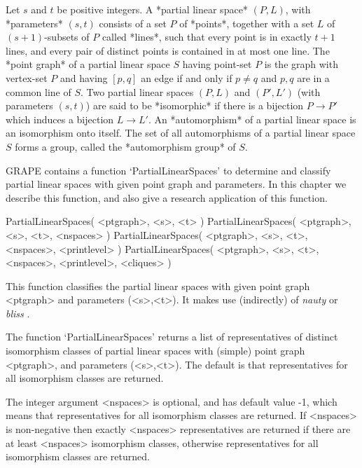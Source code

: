 %
%
%
%
\def\GRAPE{\sf GRAPE}
\def\nauty{\it nauty}
\def\bliss{\it bliss}
\def\G{\Gamma}
\def\Aut{{\rm Aut}\,}
\def\x{\times}


Let $s$ and  $t$  be positive integers. A *partial linear space*
$(P,L)$, with *parameters* $(s,t)$ consists of a set $P$ of *points*,
together with a set $L$ of $(s+1)$-subsets of $P$ called *lines*,
such that every point is in exactly $t+1$ lines, and every pair of
distinct points is contained in at most one line.  The *point graph*
of a partial linear space $S$ having point-set $P$ is the graph with
vertex-set $P$ and having $[p,q]$ an edge if and only if $p\not=q$ and
$p,q$ are in a common line of $S$. Two partial linear spaces $(P,L)$
and $(P',L')$ (with parameters $(s,t)$) are said to be *isomorphic*
if there is a bijection $P\to P'$ which induces a bijection $L\to L'$.
An *automorphism* of a partial linear space is an isomorphism onto itself.
The set of all automorphisms of a partial linear space $S$ forms a group,
called the *automorphism group* of $S$.

{\GRAPE} contains a function `PartialLinearSpaces' to determine and
classify partial linear spaces with given point graph and parameters.
In this chapter we describe this function, and also give a research
application of this function.


\>PartialLinearSpaces( <ptgraph>, <s>, <t> )
\>PartialLinearSpaces( <ptgraph>, <s>, <t>, <nspaces> )
\>PartialLinearSpaces( <ptgraph>, <s>, <t>, <nspaces>, <printlevel> )
\>PartialLinearSpaces( <ptgraph>, <s>, <t>, <nspaces>, <printlevel>, <cliques> )

This function classifies the partial linear spaces with given point
graph <ptgraph> and parameters (<s>,<t>). It makes use (indirectly)
of {\nauty} \cite{MP14} or {\bliss} \cite{JK07}.

The function `PartialLinearSpaces' returns a list of representatives
of distinct isomorphism classes of partial linear spaces with (simple)
point graph <ptgraph>, and parameters (<s>,<t>). The default is that
representatives for all isomorphism classes are returned.

The integer argument <nspaces> is optional, and has default value -1,
which means that representatives for all isomorphism classes are
returned. If <nspaces> is non-negative then exactly <nspaces>
representatives are returned if there are at least <nspaces>
isomorphism classes, otherwise representatives for all isomorphism
classes are returned.

